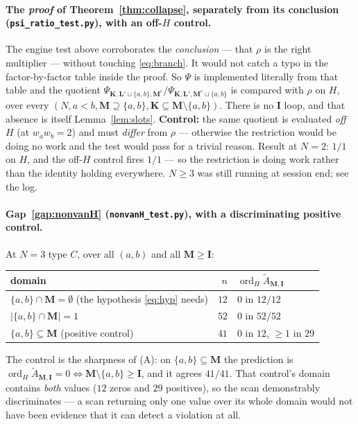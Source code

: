\documentclass[11pt]{article}
\theoremstyle{plain}
\theoremstyle{definition}
\theoremstyle{remark}
\theoremstyle{plain}
\newcommand{\bI}{\mathbf{I}}
\newcommand{\bM}{\mathbf{M}}
\newcommand{\bK}{\mathbf{K}}
\newcommand{\bL}{\mathbf{L}}
\newcommand{\At}{\widetilde{A}}
\newcommand{\ord}{\operatorname{ord}}
\begin{document}
\paragraph{The \emph{proof} of Theorem~\ref{thm:collapse}, separately from its
conclusion (\texttt{psi\_ratio\_test.py}), with an off-$H$ control.}
The engine test above corroborates the \emph{conclusion} --- that $\rho$ is the
right multiplier --- without touching \eqref{eq:branch}.  It would not catch a
typo in the factor-by-factor table inside the proof.  So $\Psi$ is implemented
literally from that table and the quotient
$\Psi_{\bK,\bL'\sqcup\{a,b\},\bM^{\mathrm c}}/
 \Psi_{\bK,\bL',\bM^{\mathrm c}\sqcup\{a,b\}}$
is compared with $\rho$ on $H$, over every
$(N,a<b,\bM\supseteq\{a,b\},\bK\subseteq\bM\setminus\{a,b\})$.  There is no
$\bI$ loop, and that absence is itself Lemma~\ref{lem:slots}.
\textbf{Control:} the same quotient is evaluated \emph{off} $H$ (at
$w_aw_b=2$) and must \emph{differ} from $\rho$ --- otherwise the restriction
would be doing no work and the test would pass for a trivial reason.  Result at
$N=2$: $1/1$ on $H$, and the off-$H$ control fires $1/1$ --- so the restriction
is doing work rather than the identity holding everywhere.  $N\ge3$ was still
running at session end; see the log.

\paragraph{Gap~\ref{gap:nonvanH} (\texttt{nonvanH\_test.py}), with a
discriminating positive control.}
At $N=3$ type $C$, over all $(a,b)$ and all $\bM\ge\bI$:
\begin{center}
\begin{tabular}{@{}lrl@{}}
\toprule
domain & $n$ & $\ord_H\At_{\bM,\bI}$ \\
\midrule
$\{a,b\}\cap\bM=\emptyset$ \quad(the hypothesis \eqref{eq:hyp} needs)
 & $12$ & $0$ in $12/12$ \\
$|\{a,b\}\cap\bM|=1$
 & $52$ & $0$ in $52/52$ \\
$\{a,b\}\subseteq\bM$ \quad(positive control)
 & $41$ & $0$ in $12$, $\ge1$ in $29$ \\
\bottomrule
\end{tabular}
\end{center}
The control is the sharpness of (A): on $\{a,b\}\subseteq\bM$ the prediction is
$\ord_H\At_{\bM,\bI}=0\iff\bM\setminus\{a,b\}\ge\bI$, and it agrees
$41/41$.  That control's domain contains \emph{both} values ($12$ zeros and
$29$ positives), so the scan demonstrably discriminates --- a scan returning
only one value over its whole domain would not have been evidence that it can
detect a violation at all.
\end{document}

